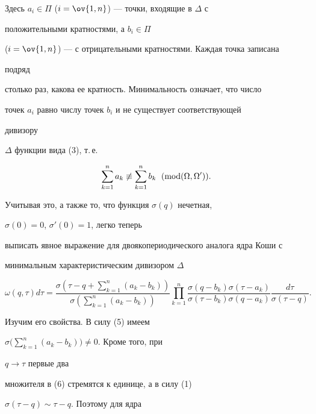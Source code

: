 Здесь $a_i\in\Pi$ ($i=\ov{1,n}$) --- точки, входящие в $\Delta$ с 


положительными кратностями, а $b_i\in\Pi$  


($i=\ov{1,n}$) --- с отрицательными кратностями. Каждая точка записана 


подряд 


столько раз, какова ее кратность. Минимальность означает, что число 


точек $a_i$ равно числу точек $b_i$ и не существует соответствующей 


дивизору 


$\Delta$ функции вида (3), т.\,е. 


\begin{equation} 


\sum^n_{k=1}a_k\not\equiv\sum^n_{k=1}b_k 


\ \;(\Mod(\Omega,\Omega')). 


\end{equation} 


Учитывая это, а также то, что функция $\sigma(q)$ нечетная, 


$\sigma(0)=0$, $\sigma'(0)=1$, легко теперь 


выписать явное выражение для двоякопериодического аналога ядра Коши с 


минимальным характеристическим дивизором $\Delta$


\begin{equation} 


\omega(q,\tau)d\tau= 


\frac{\sigma\left(\tau-q+\sum\limits^n_{k=1}(a_k-b_k)\right)} 


{\sigma\left(\sum\limits^n_{k=1}(a_k-b_k)\right)} 


\prod^n_{k=1} 


\frac{\sigma(q-b_k)\sigma(\tau-a_k)} 


{\sigma(\tau-b_k)\sigma(q-a_k)} 


\frac{d\tau}{\sigma(\tau-q)}. 


\end{equation} 


Изучим его свойства. В силу (5) имеем 


$\sigma\Big(\sum\limits^n_{k=1}(a_k-b_k)\Big)\ne 0$. Кроме того, при 


$q\to\tau$ первые два 


множителя в (6) стремятся к единице, а в силу (1) 


$\sigma(\tau-q)\sim\tau-q$. Поэтому для ядра 


